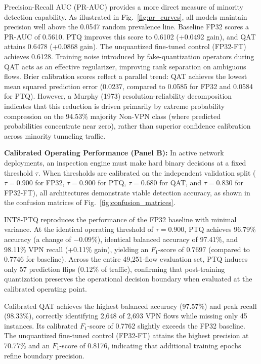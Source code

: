 \documentclass[conference]{IEEEtran}
\begin{document}
Precision-Recall AUC (PR-AUC) provides a more direct measure of minority detection capability. As illustrated in Fig.~\ref{fig:pr_curves}, all models maintain precision well above the 0.0547 random prevalence line. Baseline FP32 scores a PR-AUC of 0.5610. PTQ improves this score to 0.6102 (+0.0492 gain), and QAT attains 0.6478 (+0.0868 gain). The unquantized fine-tuned control (FP32-FT) achieves 0.6128. Training noise introduced by fake-quantization operators during QAT acts as an effective regularizer, improving rank separation on ambiguous flows. Brier calibration scores reflect a parallel trend: QAT achieves the lowest mean squared prediction error (0.0237, compared to 0.0585 for FP32 and 0.0584 for PTQ). However, a Murphy (1973) resolution-reliability decomposition indicates that this reduction is driven primarily by extreme probability compression on the 94.53\% majority Non-VPN class (where predicted probabilities concentrate near zero), rather than superior confidence calibration across minority tunneling traffic.

\textbf{Calibrated Operating Performance (Panel B):} In active network deployments, an inspection engine must make hard binary decisions at a fixed threshold $\tau$. When thresholds are calibrated on the independent validation split ($\tau = 0.900$ for FP32, $\tau = 0.900$ for PTQ, $\tau = 0.680$ for QAT, and $\tau = 0.830$ for FP32-FT), all architectures demonstrate viable detection accuracy, as shown in the confusion matrices of Fig.~\ref{fig:confusion_matrices}.

INT8-PTQ reproduces the performance of the FP32 baseline with minimal variance. At the identical operating threshold of $\tau = 0.900$, PTQ achieves 96.79\% accuracy (a change of $-0.09\%$), identical balanced accuracy of 97.41\%, and 98.11\% VPN recall (+0.11\% gain), yielding an $F_1$-score of 0.7697 (compared to 0.7746 for baseline). Across the entire 49,251-flow evaluation set, PTQ induces only 57 prediction flips ($0.12\%$ of traffic), confirming that post-training quantization preserves the operational decision boundary when evaluated at the calibrated operating point.

Calibrated QAT achieves the highest balanced accuracy (97.57\%) and peak recall (98.33\%), correctly identifying 2,648 of 2,693 VPN flows while missing only 45 instances. Its calibrated $F_1$-score of 0.7762 slightly exceeds the FP32 baseline. The unquantized fine-tuned control (FP32-FT) attains the highest precision at 70.77\% and an $F_1$-score of 0.8176, indicating that additional training epochs refine boundary precision.
\end{document}
